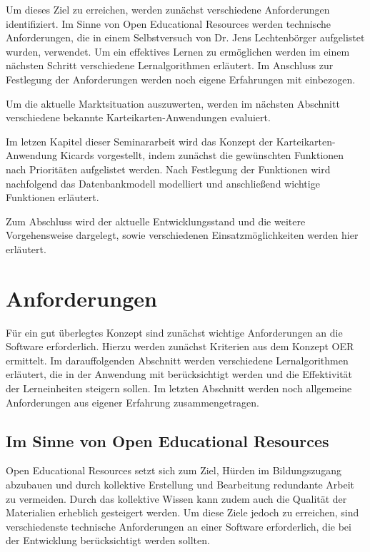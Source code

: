 Um dieses Ziel zu erreichen, werden zunächst verschiedene Anforderungen identifiziert. Im Sinne von Open Educational Resources werden technische Anforderungen, die in einem Selbstversuch von Dr. Jens Lechtenbörger aufgelistet wurden, verwendet. Um ein effektives Lernen zu ermöglichen werden im einem nächsten Schritt verschiedene Lernalgorithmen erläutert. Im Anschluss zur Festlegung der Anforderungen werden noch eigene Erfahrungen mit einbezogen.

Um die aktuelle Marktsituation auszuwerten, werden im nächsten Abschnitt verschiedene bekannte Karteikarten-Anwendungen evaluiert. 

Im letzen Kapitel dieser Seminararbeit wird das Konzept der Karteikarten-Anwendung Kicards vorgestellt, indem zunächst die gewünschten Funktionen nach Prioritäten aufgelistet werden. Nach Festlegung der Funktionen wird nachfolgend das Datenbankmodell modelliert und anschließend wichtige Funktionen erläutert. 

Zum Abschluss wird der aktuelle Entwicklungsstand und die weitere Vorgehensweise dargelegt, sowie verschiedenen Einsatzmöglichkeiten werden hier erläutert.


\section{Anforderungen}
Für ein gut überlegtes Konzept sind zunächst wichtige Anforderungen an die Software erforderlich. Hierzu werden zunächst Kriterien aus dem Konzept OER ermittelt. Im darauffolgenden Abschnitt werden verschiedene Lernalgorithmen erläutert, die in der Anwendung mit berücksichtigt werden und die Effektivität der Lerneinheiten steigern sollen. Im letzten Abschnitt werden noch allgemeine Anforderungen aus eigener Erfahrung zusammengetragen.

\subsection{Im Sinne von Open Educational Resources}
Open Educational Resources setzt sich zum Ziel, Hürden im Bildungszugang abzubauen und durch kollektive Erstellung und Bearbeitung redundante Arbeit zu vermeiden. Durch das kollektive Wissen kann zudem auch die Qualität der Materialien erheblich gesteigert werden. Um diese Ziele jedoch zu erreichen, sind verschiedenste technische Anforderungen an einer Software erforderlich, die bei der Entwicklung berücksichtigt werden sollten. \\

